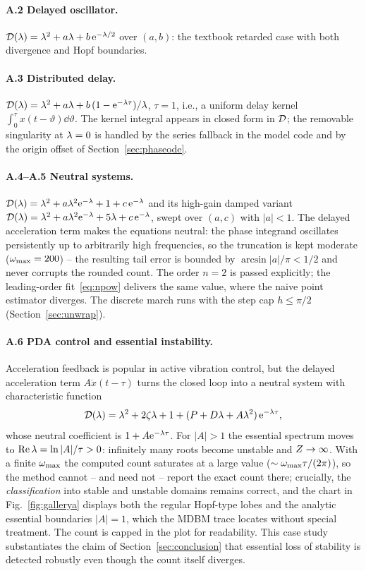\paragraph{A.2 Delayed oscillator.}
$\mathcal{D}(\lambda)=\lambda^2+a\lambda+b\,\mathrm{e}^{-\lambda/2}$ over $(a,b)$: the textbook
retarded case with both divergence and Hopf boundaries.

\paragraph{A.3 Distributed delay.}
$\mathcal{D}(\lambda)=\lambda^2+a\lambda+b\,(1-\mathrm{e}^{-\lambda\tau})/\lambda$, $\tau=1$, i.e., a
uniform delay kernel $\int_0^\tau x(t-\vartheta)\dd\vartheta$. The kernel
integral appears in closed form in $\mathcal{D}$; the removable singularity at
$\lambda=0$ is handled by the series fallback in the model code and by the
origin offset of Section~\ref{sec:phaseode}.

\paragraph{A.4--A.5 Neutral systems.}
$\mathcal{D}(\lambda)=\lambda^2+a\lambda^2\mathrm{e}^{-\lambda}+1+c\,\mathrm{e}^{-\lambda}$ and its high-gain
damped variant $\mathcal{D}(\lambda)=\lambda^2+a\lambda^2\mathrm{e}^{-\lambda}+5\lambda+c\,\mathrm{e}^{-\lambda}$,
swept over $(a,c)$ with $|a|<1$. The delayed acceleration term makes the
equations neutral: the phase integrand oscillates persistently up to
arbitrarily high frequencies, so the truncation is kept moderate
($\omega_{\mathrm{max}}=200$) -- the resulting tail error is bounded by
$\arcsin|a|/\pi<1/2$ and never corrupts the rounded count. The order $n=2$
is passed explicitly; the leading-order fit~\eqref{eq:npow} delivers the same
value, where the naive point estimator diverges. The discrete march runs with
the step cap $h\le\pi/2$ (Section~\ref{sec:unwrap}).

\paragraph{A.6 PDA control and essential instability.}
Acceleration feedback is popular in active vibration control, but the
delayed acceleration term $A\ddot x(t-\tau)$ turns the closed loop into a
neutral system with characteristic function
\begin{equation*}
  \mathcal{D}(\lambda)=\lambda^2+2\zeta\lambda+1+(P+D\lambda+A\lambda^2)\,\mathrm{e}^{-\lambda\tau},
\end{equation*}
whose neutral coefficient is $1+A\mathrm{e}^{-\lambda\tau}$. For $|A|>1$ the
essential spectrum moves to $\operatorname{Re}\lambda=\ln|A|/\tau>0$: infinitely many
roots become unstable and $Z\to\infty$. With a finite $\omega_{\mathrm{max}}$ the
computed count saturates at a large value ($\sim\omega_{\mathrm{max}}\tau/(2\pi)$), so the
method cannot -- and need not -- report the exact count there; crucially,
the \emph{classification} into stable and unstable domains remains correct,
and the chart in Fig.~\ref{fig:gallerya} displays both the regular
Hopf-type lobes and the analytic essential boundaries $|A|=1$, which the
MDBM trace locates without special treatment. The count is capped in the
plot for readability. This case study substantiates the claim of
Section~\ref{sec:conclusion} that essential loss of stability is detected
robustly even though the count itself diverges.

